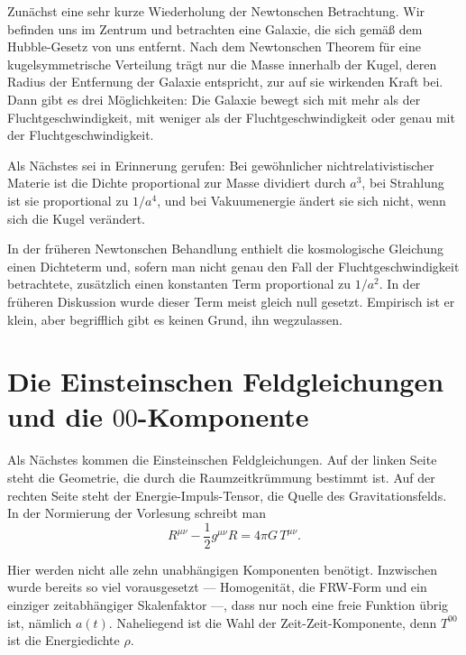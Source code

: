 Zunächst eine sehr kurze Wiederholung der Newtonschen Betrachtung. Wir befinden uns im Zentrum und betrachten eine Galaxie, die sich gemäß dem Hubble-Gesetz von uns entfernt. Nach dem Newtonschen Theorem für eine kugelsymmetrische Verteilung trägt nur die Masse innerhalb der Kugel, deren Radius der Entfernung der Galaxie entspricht, zur auf sie wirkenden Kraft bei. Dann gibt es drei Möglichkeiten: Die Galaxie bewegt sich mit mehr als der Fluchtgeschwindigkeit, mit weniger als der Fluchtgeschwindigkeit oder genau mit der Fluchtgeschwindigkeit.

Als Nächstes sei in Erinnerung gerufen: Bei gewöhnlicher nichtrelativistischer Materie ist die Dichte proportional zur Masse dividiert durch \(a^3\), bei Strahlung ist sie proportional zu \(1/a^4\), und bei Vakuumenergie ändert sie sich nicht, wenn sich die Kugel verändert.

In der früheren Newtonschen Behandlung enthielt die kosmologische Gleichung einen Dichteterm und, sofern man nicht genau den Fall der Fluchtgeschwindigkeit betrachtete, zusätzlich einen konstanten Term proportional zu \(1/a^2\). In der früheren Diskussion wurde dieser Term meist gleich null gesetzt. Empirisch ist er klein, aber begrifflich gibt es keinen Grund, ihn wegzulassen.

\section{Die Einsteinschen Feldgleichungen und die \(00\)-Komponente}

Als Nächstes kommen die Einsteinschen Feldgleichungen. Auf der linken Seite steht die Geometrie, die durch die Raumzeitkrümmung bestimmt ist. Auf der rechten Seite steht der Energie-Impuls-Tensor, die Quelle des Gravitationsfelds. In der Normierung der Vorlesung schreibt man
\begin{equation}
R^{\mu\nu}-\frac{1}{2}g^{\mu\nu}R=4\pi G\,T^{\mu\nu}.
\end{equation}

Hier werden nicht alle zehn unabhängigen Komponenten benötigt. Inzwischen wurde bereits so viel vorausgesetzt --- Homogenität, die FRW-Form und ein einziger zeitabhängiger Skalenfaktor ---, dass nur noch eine freie Funktion übrig ist, nämlich \(a(t)\). Naheliegend ist die Wahl der Zeit-Zeit-Komponente, denn \(T^{00}\) ist die Energiedichte \(\rho\).

